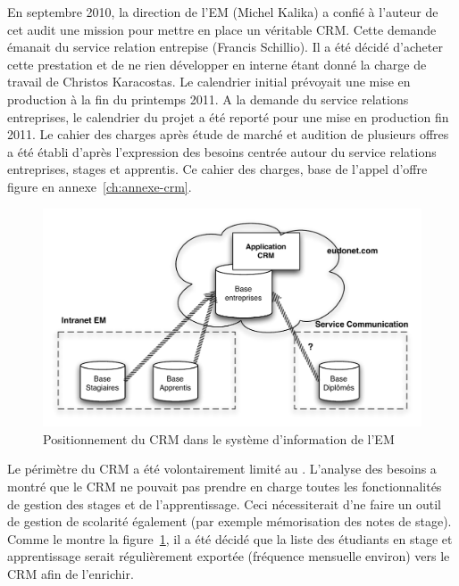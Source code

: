 \documentclass{book}
\begin{document}
En septembre 2010, la direction de l'EM (Michel Kalika) a confié
à l'auteur de cet audit une mission pour mettre en place un véritable
CRM. Cette demande émanait du service relation entrepise (Francis 
Schillio). Il a été décidé d'acheter cette prestation et de ne rien 
développer en interne étant donné la charge de travail de Christos 
Karacostas. Le calendrier initial prévoyait une mise en production 
à la fin du printemps 2011. A la demande du service relations 
entreprises, le calendrier du projet a été reporté pour une mise en 
production fin 2011.
Le cahier des charges après étude de marché et audition de
plusieurs offres a été établi d'après l'expression des besoins
centrée autour du service relations entreprises, stages et apprentis.
Ce cahier des charges, base de l'appel d'offre figure en annexe~\ref{ch:annexe-crm}.\\

\begin{figure}[hbt]
\begin{center}
\includegraphics[width=.9\linewidth]{figs/crm_overview.pdf}
\end{center}
\caption{Positionnement du CRM dans le système d'information de l'EM}
\label{fg:crm_overview}
\end{figure}

Le périmètre du CRM  a été volontairement limité au \sre. L'analyse 
des besoins a montré que le CRM ne pouvait pas prendre en charge 
toutes les fonctionnalités de gestion des stages et de l'apprentissage. 
Ceci nécessiterait d'ne faire un outil de gestion de scolarité également
(par exemple mémorisation des notes de stage). Comme le montre la 
figure~\ref{fg:crm_overview}, il a été décidé que la liste des étudiants 
en stage et apprentissage serait régulièrement exportée (fréquence 
mensuelle environ) vers le CRM afin de l'enrichir.\\
\end{document}
